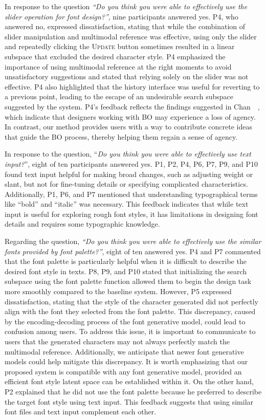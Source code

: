 In response to the question \textit{``Do you think you were able to effectively use the slider operation for font design?''}, nine participants answered yes.
P4, who answered no, expressed dissatisfaction, stating that while the combination of slider manipulation and multimodal reference was effective, using only the slider and repeatedly clicking the \textsc{Update} button sometimes resulted in a linear subspace that excluded the desired character style.
P4 emphasized the importance of using multimodal reference at the right moments to avoid unsatisfactory suggestions and stated that relying solely on the slider was not effective.
P4 also highlighted that the history interface was useful for reverting to a previous point, leading to the escape of an undesirable search subspace suggested by the system.
P4's feedback reflects the findings suggested in Chan~\etal~\cite{Chan2022}, which indicate that designers working with BO may experience a loss of agency.
In contrast, our method provides users with a way to contribute concrete ideas that guide the BO process, thereby helping them regain a sense of agency.

In response to the question, ``\textit{Do you think you were able to effectively use text input?}'', eight of ten participants answered yes.
P1, P2, P4, P6, P7, P9, and P10 found text input helpful for making broad changes, such as adjusting weight or slant, but not for fine-tuning details or specifying complicated characteristics.
Additionally, P1, P6, and P7 mentioned that understanding typographical terms like ``bold'' and ``italic'' was necessary.
This feedback indicates that while text input is useful for exploring rough font styles, it has limitations in designing font details and requires some typographic knowledge.

Regarding the question, \textit{``Do you think you were able to effectively use the similar fonts provided by font palette?''}, eight of ten answered yes.
P4 and P7 commented that the font palette is particularly helpful when it is difficult to describe the desired font style in texts.
P8, P9, and P10 stated that initializing the search subspace using the font palette function allowed them to begin the design task more smoothly compared to the baseline system.
However, P5 expressed dissatisfaction, stating that the style of the character generated did not perfectly align with the font they selected from the font palette.
This discrepancy, caused by the encoding-decoding process of the font generative model, could lead to confusion among users.
To address this issue, it is important to communicate to users that the generated characters may not always perfectly match the multimodal reference.
Additionally, we anticipate that newer font generative models could help mitigate this discrepancy.
It is worth emphasizing that our proposed system is compatible with any font generative model, provided an efficient font style latent space can be established within it.
On the other hand, P2 explained that he did not use the font palette because he preferred to describe the target font style using text input.
This feedback suggests that using similar font files and text input complement each other.

